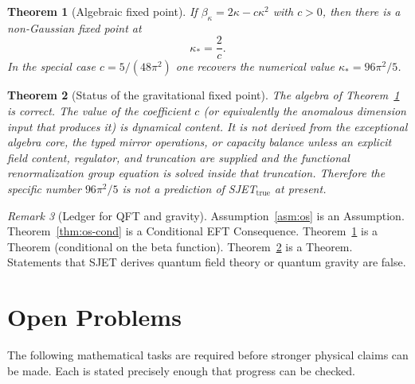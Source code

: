 \documentclass[11pt]{article}
\theoremstyle{plain}
\newtheorem{theorem}{Theorem}[section]
\theoremstyle{definition}
\theoremstyle{remark}
\newtheorem{remark}[theorem]{Remark}
\numberwithin{equation}{section}
\begin{document}
\begin{theorem}[Algebraic fixed point]\label{thm:kappa-alg}
If $\beta_\kappa = 2\kappa - c\kappa^2$ with $c>0$, then there is a non-Gaussian fixed point at
\[
\kappa_* = \frac{2}{c}.
\]
In the special case $c = 5/(48\pi^2)$ one recovers the numerical value $\kappa_* = 96\pi^2/5$.
\end{theorem}

\begin{theorem}[Status of the gravitational fixed point]\label{thm:kappa-status}
The algebra of Theorem~\ref{thm:kappa-alg} is correct. The value of the coefficient $c$ (or equivalently the anomalous dimension input that produces it) is dynamical content. It is not derived from the exceptional algebra core, the typed mirror operations, or capacity balance unless an explicit field content, regulator, and truncation are supplied and the functional renormalization group equation is solved inside that truncation. Therefore the specific number $96\pi^2/5$ is not a prediction of SJET$_{\mathrm{true}}$ at present.
\end{theorem}

\begin{remark}[Ledger for QFT and gravity]
Assumption~\ref{asm:os} is an Assumption. Theorem~\ref{thm:os-cond} is a Conditional EFT Consequence. Theorem~\ref{thm:kappa-alg} is a Theorem (conditional on the beta function). Theorem~\ref{thm:kappa-status} is a Theorem. Statements that SJET derives quantum field theory or quantum gravity are false.
\end{remark}

\section{Open Problems}
\label{sec:open}

The following mathematical tasks are required before stronger physical claims can be made. Each is stated precisely enough that progress can be checked.
\end{document}
